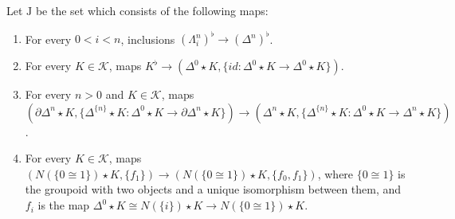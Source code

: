 \documentclass[reqno]{amsart}
\theoremstyle{definition}
\theoremstyle{remark}
\newcommand{\cat}[1]{\mathbf{#1}}
\newcommand{\sSet}{\cat{sSet}}
\newcommand{\lc}{lc}
\newcommand{\lcc}{lcc}
\newcommand{\mlcc}{\mathrm{\lcc}}
\newcommand{\lccsSet}{\sSet^\mlcc}
\newcommand{\join}{\star}
\newcommand{\J}{\mathrm{J}}
\numberwithin{figure}{section}
\begin{document}
Let $\J$ be the set which consists of the following maps:
\begin{enumerate}
\item For every $0 < i < n$, inclusions $(\Lambda^n_i)^\flat \to (\Delta^n)^\flat$.
\item For every $K \in \mathcal{K}$, maps $K^\flat \to (\Delta^0 \join K, \{ id : \Delta^0 \join K \to \Delta^0 \join K \})$.
\item For every $n > 0$ and $K \in \mathcal{K}$, maps $(\partial \Delta^n \join K, \{ \Delta^{\{n\}} \join K : \Delta^0 \join K \to \partial \Delta^n \join K \}) \to (\Delta^n \join K, \{ \Delta^{\{n\}} \join K : \Delta^0 \join K \to \Delta^n \join K \})$.
\item For every $K \in \mathcal{K}$, maps $(N(\{ 0 \cong 1 \}) \join K,\{ f_1 \}) \to (N(\{ 0 \cong 1 \}) \join K,\{ f_0, f_1 \})$, where
$\{ 0 \cong 1 \}$ is the groupoid with two objects and a unique isomorphism between them, and
$f_i$ is the map $\Delta^0 \join K \cong N(\{i\}) \join K \to N(\{ 0 \cong 1 \}) \join K$.
\end{enumerate}


\begin{comment}
\begin{defn}
An \emph{\lcc-marked simplicial set} is an \lc-marked simplicial set $X$ together with a subset of the set of edges $\Delta^1 \to X$.
Edges that belong to this subset will be caled \emph{marked}.
A morphism of \lcc-marked simplicial sets is a map of the underlying \lc-marked simplicial sets that preserves marked edges.
The category of \lcc-marked simplicial sets will be denoted by $\lccsSet$.
\end{defn}
\end{comment}
\end{document}
